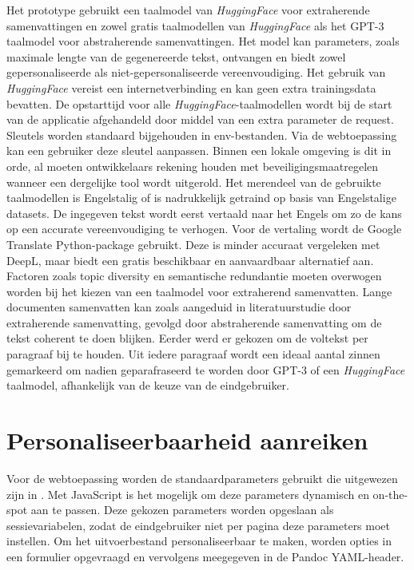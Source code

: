 Het prototype gebruikt een taalmodel van \textit{HuggingFace} voor extraherende samenvattingen en zowel gratis taalmodellen van \textit{HuggingFace} als het GPT-3 taalmodel voor abstraherende samenvattingen. Het model kan parameters, zoals maximale lengte van de gegenereerde tekst, ontvangen en biedt zowel gepersonaliseerde als niet-gepersonaliseerde vereenvoudiging. Het gebruik van \textit{HuggingFace} vereist een internetverbinding en kan geen extra trainingsdata bevatten. De opstarttijd voor alle \textit{HuggingFace}-taalmodellen wordt bij de start van de applicatie afgehandeld door middel van een extra parameter de request. Sleutels worden standaard bijgehouden in env-bestanden. Via de webtoepassing kan een gebruiker deze sleutel aanpassen. Binnen een lokale omgeving is dit in orde, al moeten ontwikkelaars rekening houden met beveiligingsmaatregelen wanneer een dergelijke tool wordt uitgerold. Het merendeel van de gebruikte taalmodellen is Engelstalig of is nadrukkelijk getraind op basis van Engelstalige datasets. De ingegeven tekst wordt eerst vertaald naar het Engels om zo de kans op een accurate vereenvoudiging te verhogen. Voor de vertaling wordt de Google Translate Python-package gebruikt. Deze is minder accuraat vergeleken met DeepL, maar biedt een gratis beschikbaar en aanvaardbaar alternatief aan. Factoren zoals topic diversity en semantische redundantie moeten overwogen worden bij het kiezen van een taalmodel voor extraherend samenvatten. Lange documenten samenvatten kan zoals aangeduid in literatuurstudie door extraherende samenvatting, gevolgd door abstraherende samenvatting om de tekst coherent te doen blijken. Eerder werd er gekozen om de voltekst per paragraaf bij te houden. Uit iedere paragraaf wordt een ideaal aantal zinnen gemarkeerd om nadien geparafraseerd te worden door GPT-3 of een \textit{HuggingFace} taalmodel, afhankelijk van de keuze van de eindgebruiker.


\section{Personaliseerbaarheid aanreiken}

Voor de webtoepassing worden de standaardparameters gebruikt die uitgewezen zijn in \textcite{Rello2013a, Rello2013b}. Met JavaScript is het mogelijk om deze parameters dynamisch en on-the-spot aan te passen. Deze gekozen parameters worden opgeslaan als sessievariabelen, zodat de eindgebruiker niet per pagina deze parameters moet instellen. Om het uitvoerbestand personaliseerbaar te maken, worden opties in een formulier opgevraagd en vervolgens meegegeven in de Pandoc YAML-header.

